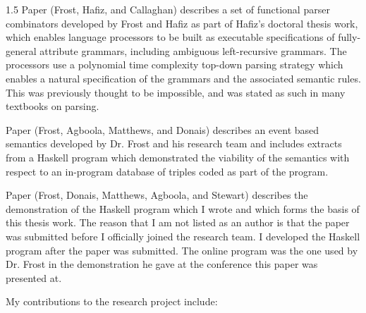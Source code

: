 \documentclass[fleqn, oneside, 12pt]{book}
\theoremstyle{definitionsty}
\newcommand{\uwinonehalfspacelen}{1.5}
\newcommand{\uwindefaultspacelen}{\uwinonehalfspacelen}
\newenvironment{uwindefaultspaceenv}%
{\begin{spacing}{\uwindefaultspacelen}}%
	{\end{spacing}}
\begin{document}
\cite{frosthafiz2008} 

\cite{frostagboola2014} 

\cite{frost2014demonstration} 

\begin{uwindefaultspaceenv}
	Paper \cite{frosthafiz2008} (Frost, Hafiz, and Callaghan) describes a set of functional parser combinators developed by Frost and Hafiz as part of Hafiz's doctoral thesis work, which enables language processors to be built as executable specifications of fully-general attribute grammars, including ambiguous left-recursive grammars.  The processors use a polynomial time complexity top-down parsing strategy which enables a natural specification of the grammars and the associated semantic rules.  This was previously thought to be impossible, and was stated as such in many textbooks on parsing.
	
	Paper \cite{frostagboola2014} (Frost, Agboola, Matthews, and Donais) describes an event based semantics developed by Dr. Frost and his research team and includes extracts from a Haskell program which demonstrated the viability of the semantics with respect to an in-program database of triples coded as part of the program.
	
	Paper \cite{frost2014demonstration} (Frost, Donais, Matthews, Agboola, and Stewart) describes the demonstration of the Haskell program which I wrote and which forms the basis of this thesis work.  The reason that I am not listed as an author is that the paper was submitted before I officially joined the research team.  I developed the Haskell program after the paper was submitted.  The online program was the one used by Dr. Frost in the demonstration he gave at the conference this paper was presented at.
	
	My contributions to the research project include:
	

\end{uwindefaultspaceenv}
\end{document}
